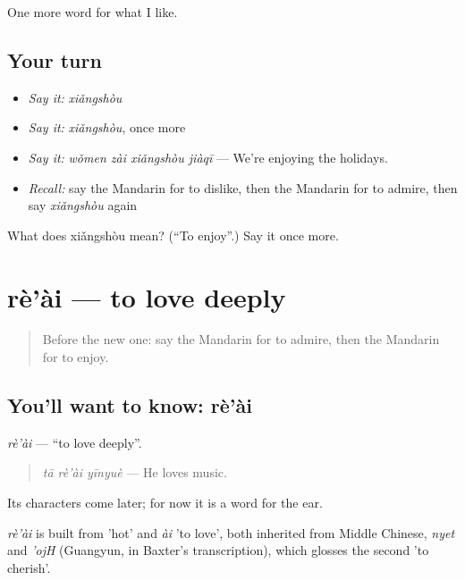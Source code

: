 \begin{grammarlens}[title={What you've built}]
One more word for what I like.
\end{grammarlens}

\subsection*{Your turn}
\begin{itemize}
\raggedright
  \item \emph{Say it:} \emph{xiǎngshòu}
  \item \emph{Say it:} \emph{xiǎngshòu}, once more
  \item \emph{Say it:} \emph{wǒmen zài xiǎngshòu jiàqī} — We're enjoying the holidays.
  \item \emph{Recall:} say the Mandarin for to dislike, then the Mandarin for to admire, then say \emph{xiǎngshòu} again
\end{itemize}

\begin{tcolorbox}[breakable,colback=teal!4,colframe=teal!35!black,title={Before you move on}]
What does xiǎngshòu mean? (\textquotedblleft{}To enjoy\textquotedblright{}.) Say it once more.
\end{tcolorbox}
\section[rè'ài]{rè'ài — to love deeply}

\label{lesson:ZH-C277-reai}



\begin{quote}
Before the new one: say the Mandarin for to admire, then the Mandarin for to enjoy.
\end{quote}

\subsection*{You'll want to know: rè'ài}
\emph{rè'ài} — \textquotedblleft{}to love deeply\textquotedblright{}.

\begin{quote}
\emph{tā rè'ài yīnyuè} — He loves music.
\end{quote}

Its characters come later; for now it is a word for the ear.

\begin{cousinweb}
\emph{rè'ài} is built from  'hot' and \emph{ài} 'to love', both inherited from Middle Chinese, \emph{nyet} and \emph{'ojH} (Guangyun, in Baxter's transcription), which glosses the second 'to cherish'.
\end{cousinweb}

